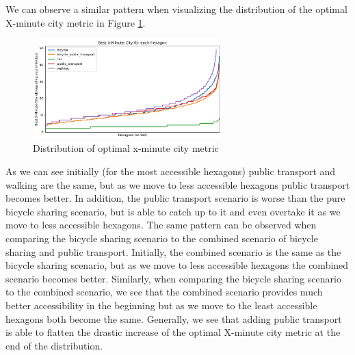 We can observe a similar pattern when visualizing the distribution of the optimal X-minute city metric in Figure \ref{fig:optimal_x_minute_city_metric}.
\begin{figure}
  \begin{center}
    \includegraphics[width=0.65\textwidth]{Figures/results/minute_city_metric/best_x_minute_city}
  \end{center}
  \caption{Distribution of optimal x-minute city metric}
  \label{fig:optimal_x_minute_city_metric}
\end{figure}
As we can see initially (for the most accessible hexagons) public transport and walking are the same, but as we move to less accessible hexagons public transport becomes better.
In addition, the public transport scenario is worse than the pure bicycle sharing scenario, but is able to catch up to it and even overtake it as we move to less accessible hexagons.
The same pattern can be observed when comparing the bicycle sharing scenario to the combined scenario of bicycle sharing and public transport.
Initially, the combined scenario is the same as the bicycle sharing scenario, but as we move to less accessible hexagons the combined scenario becomes better.
Similarly, when comparing the bicycle sharing scenario to the combined scenario, we see that the combined scenario provides much better accessibility in the beginning but as we move to the least accessible hexagons both become the same.
Generally, we see that adding public transport is able to flatten the drastic increase of the optimal X-minute city metric at the end of the distribution.


